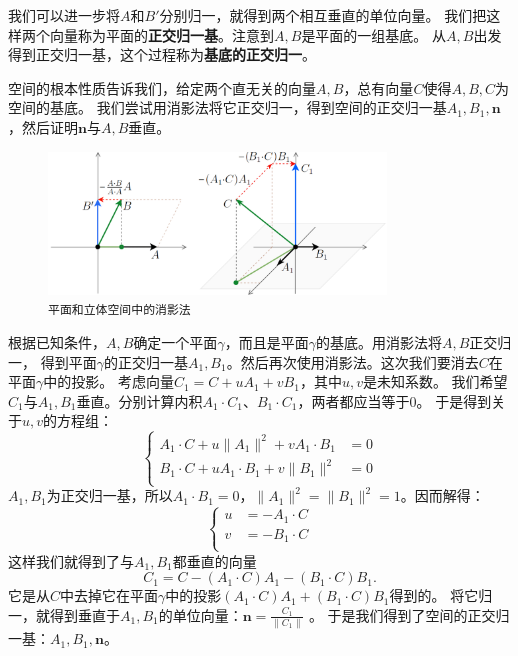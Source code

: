 \documentclass[12pt,UTF8]{ctexbook}
\begin{document}
我们可以进一步将$A$和$B'$分别归一，就得到两个相互垂直的单位向量。
我们把这样两个向量称为平面的\textbf{正交归一基}。注意到$A,B$是平面的一组基底。
从$A,B$出发得到正交归一基，这个过程称为\textbf{基底的正交归一}。

空间的根本性质告诉我们，给定两个直无关的向量$A,B$，总有向量$C$使得$A,B,C$为空间的基底。
我们尝试用消影法将它正交归一，得到空间的正交归一基$A_1,B_1,\mathbf{n}$，然后证明$\mathbf{n}$与$A,B$垂直。

\begin{figure}[h] 
    \centering
    \includegraphics[width=0.8\textwidth]{tu/消影法1.png}
    \caption*{\texttt{平面和立体空间中的消影法}}
\end{figure}

根据已知条件，$A,B$确定一个平面$\gamma$，而且是平面$\gamma$的基底。用消影法将$A,B$正交归一，
得到平面$\gamma$的正交归一基$A_1,B_1$。然后再次使用消影法。这次我们要消去$C$在平面$\gamma$中的投影。
考虑向量$C_1=C+uA_1+vB_1$，其中$u,v$是未知系数。
我们希望$C_1$与$A_1,B_1$垂直。分别计算内积$A_1\cdot C_1$、$B_1\cdot C_1$，两者都应当等于$0$。
于是得到关于$u,v$的方程组：
$$
    \left\{
    \begin{array}{cl}
    A_1\cdot C + u\|A_1\|^2 + vA_1\cdot B_1 &= 0 \\
    B_1\cdot C + uA_1\cdot B_1 + v\|B_1\|^2 &= 0 \\
    \end{array}
    \right.
$$
$A_1,B_1$为正交归一基，所以$A_1\cdot B_1 = 0$，$\|A_1\|^2 = \|B_1\|^2 = 1$。因而解得：
$$
    \left\{
    \begin{array}{cl}
    u &= -A_1\cdot C \\
    v &= -B_1\cdot C \\
    \end{array}
    \right.
$$
这样我们就得到了与$A_1,B_1$都垂直的向量
$$ C_1 = C - (A_1\cdot C)A_1 - (B_1\cdot C)B_1. $$
它是从$C$中去掉它在平面$\gamma$中的投影$(A_1\cdot C)A_1 + (B_1\cdot C)B_1$得到的。
将它归一，就得到垂直于$A_1,B_1$的单位向量：$\mathbf{n} = \frac{C_1}{\|C_1\|}$ 。
于是我们得到了空间的正交归一基：$A_1,B_1,\mathbf{n}$。
\end{document}
